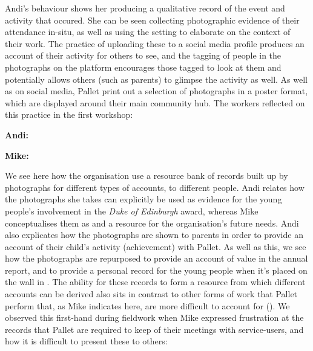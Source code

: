 Andi's behaviour shows her producing a qualitative record of the event and activity that occured. She can be seen collecting photographic evidence of their attendance in-situ, as well as using the setting to elaborate on the context of their work. The practice of uploading these to a social media profile produces an account of their activity for others to see, and the tagging of people in the photographs on the platform encourages those tagged to look at them and potentially allows others (such as parents) to glimpse the activity as well. As well as on social media, Pallet print out a selection of photographs in a poster format, which are displayed around their main community hub. The workers reflected on this practice in the first workshop:

\textbf{Andi:} 

\textbf{Mike:} 

We see here how the organisation use a resource bank of records built up by photographs for different types of accounts, to different people. Andi relates how the photographs she takes can explicitly be used as evidence for the young people's involvement in the \textit{Duke of Edinburgh} award, whereas Mike conceptualises them as  and a resource for the organisation's future needs. Andi also explicates how the photographs are shown to parents in order to provide an account of their child's activity (achievement) with Pallet. As well as this, we see how the photographs are repurposed to provide an account of value in the annual report, and to provide a personal record for the young people when it's placed on the wall in . The ability for these records to form a resource from which different accounts can be derived also sits in contrast to other forms of work that Pallet perform that, as Mike indicates here, are more difficult to account for (). We observed this first-hand during fieldwork when Mike expressed frustration at the records that Pallet are required to keep of their meetings with service-users, and how it is difficult to present these to others:

